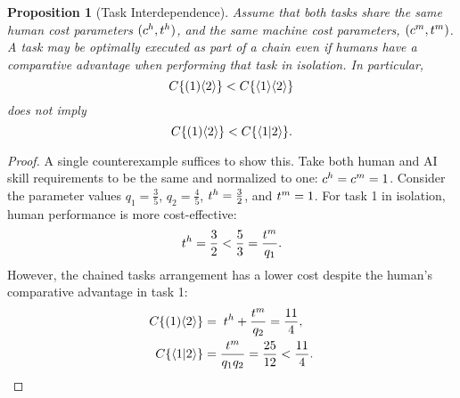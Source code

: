 \documentclass{article}
\theoremstyle{plain}
\theoremstyle{plain}
\newtheorem{proposition}[theorem]{Proposition}
\begin{document}
\begin{proposition}[Task Interdependence] \label{proposition:interdependence}
Assume that both tasks share the same human cost parameters $(c^{h}_{}, t^{h}_{})$, and the same machine cost parameters, $(c^{m}_{}, t^{m}_{})$.
A task may be optimally executed as part of a chain even if humans have a comparative advantage when performing that task in isolation.
In particular,
\[
C\{ ( 1 )\langle 2 \rangle \} < C\{ \langle 1 \rangle\langle 2 \rangle \}
\]
does not imply
\[
C\{ ( 1 )\langle 2 \rangle \} < C\{ \langle 1|2 \rangle \}.
\]
\end{proposition}
\begin{proof}
A single counterexample suffices to show this.
Take both human and AI skill requirements to be the same and normalized to one: \(c^{h}_{} = c^{m}_{} = 1\).
Consider the parameter values $q_1 = \frac{3}{5}$, $q_2 = \frac{4}{5}$, $t^{h}_{} = \frac{3}{2}$, and $t^{m}_{} = 1$.
For task 1 in isolation, human performance is more cost-effective:
\[
t^{h}_{} = \frac{3}{2} < \frac{5}{3} = \frac{t^{m}_{}}{q_1}.
\]
However, the chained tasks arrangement has a lower cost despite the human's comparative advantage in task 1:
\begin{align*}
    C\{ ( 1 )\langle 2 \rangle \} &= \; t^{h}_{} + \frac{t^{m}_{}}{q_2} = \frac{11}{4}, \\
    C\{ \langle 1|2 \rangle \} &= \frac{t^{m}_{}}{q_1 q_2} = \frac{25}{12} < \frac{11}{4}.
\end{align*}
\end{proof}
\end{document}
